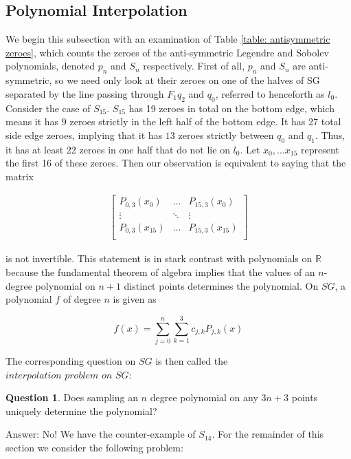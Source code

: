 \documentclass[12pt]{amsart}
\theoremstyle{plain}
\theoremstyle{definition}
\newtheorem{question}{Question}[section]
\newcommand{\RR}{\mathbb{R}}
\begin{document}
\subsection{Polynomial Interpolation}

We begin this subsection with an examination of Table \ref{table: antisymmetric zeroes}, which counts the zeroes of the anti-symmetric Legendre and Sobolev polynomials, denoted $p_n$ and $S_n$ respectively. First of all, $p_n$ and $S_n$ are anti-symmetric, so we need only look at their zeroes on one of the halves of SG separated by the line passing through $F_1q_2$ and $q_0$, referred to henceforth as $l_0$. Consider the case of $S_{15}$. $S_{15}$ has 19 zeroes in total on the bottom edge, which means it has $9$ zeroes strictly in the left half of the bottom edge. It has 27 total side edge zeroes, implying that it has $13$ zeroes strictly between $q_0$ and $q_1$. Thus, it has at least 22 zeroes in one half that do not lie on $l_0$. Let $x_0, \ldots x_{15}$ represent the first 16 of these zeroes. Then our observation is equivalent to saying that the matrix

\begin{align}
    \begin{bmatrix}
    P_{0,3}(x_0) & \ldots & P_{15,3}(x_0) \\
    \vdots & \ddots & \vdots \\
    P_{0,3}(x_{15}) & \ldots & P_{15,3}(x_{15})\\
    \end{bmatrix}
\end{align}

is not invertible. This statement is in stark contrast with polynomials on $\RR$ because the fundamental theorem of algebra implies that the values of an $n$-degree polynomial on $n+1$ distinct points determines the polynomial. On $SG$, a polynomial $f$ of degree $n$ is given as 

$$ f(x) = \sum_{j=0}^{n}\sum_{k=1}^{3}c_{j,k}P_{j,k}(x)$$

The corresponding question on $SG$ is then called the $\textit{interpolation problem on SG}$:

\begin{question}
Does sampling an $n$ degree polynomial on any $3n + 3$ points uniquely determine the polynomial? 
\end{question}

Answer: No! We have the counter-example of $S_{14}$. For the remainder of this section we consider the following problem: 
\end{document}
